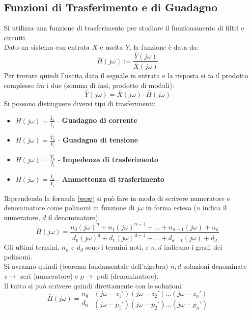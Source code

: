 \documentclass[../main.tex]{subfiles}
\begin{document}
	\subsection{Funzioni di Trasferimento e di Guadagno}
	Si utilizza una funzione di trasferimento per studiare il funzionamento di filtri e circuiti. \\
	Dato un sistema con entrata $\bar X$ e uscita $\bar Y$, la funzione è data da:
	\begin{equation} \label{wow}
		\bar H(j\omega) := \frac{\bar Y(j\omega)}{\bar X(j\omega)}	
	\end{equation}
	Per trovare quindi l'uscita dato il segnale in entrata e la risposta si fa il prodotto complesso fra i due (somma di fasi, prodotto di moduli):
	\begin{equation}
		\bar Y(j\omega) = \bar X(j\omega) \cdot \bar H(j\omega)	
	\end{equation}
	Si possono distinguere diversi tipi di trasferimenti:
	\begin{itemize}
		\item $H(j\omega) = \frac{\bar I_u}{\bar I_i}$ - \textbf{Guadagno di corrente}
		\item $H(j\omega) = \frac{\bar V_u}{\bar V_i}$ - \textbf{Guadagno di tensione}
		\item $H(j\omega) = \frac{\bar V_u}{\bar I_i}$ - \textbf{Impedenza di trasferimento}
		\item $H(j\omega) = \frac{\bar I_u}{\bar V_i}$ - \textbf{Ammettenza di trasferimento}
	\end{itemize}
	Riprendendo la formula \ref{wow} si può fare in modo di scrivere numeratore e denominatore come polinomi in funzione di $j\omega$ in forma estesa ($n$ indica il numeratore, $d$ il denominatore):
	\begin{equation}
		\bar H(j\omega) = \frac{n_0 (j\omega)^n + n_1(j\omega)^{n-1} + \dots + n_{n-1}(j\omega) + n_n}{d_0(j\omega)^d+d_1(j\omega)^{d-1}+\dots+d_{d-1}(j\omega) +d_d}
	\end{equation}
	Gli ultimi termini, $n_n$ e $d_d$ sono i termini noti, e $n, d$ indicano i gradi dei polinomi. \\
	Si avranno quindi (teorema fondamentale dell'algebra) $n, d$ soluzioni denominate $z\rightarrow$ zeri (numeratore) e $p\rightarrow$ poli (denominatore). \\
	Il tutto si può scrivere quindi direttamente con le soluzioni:
	\begin{equation}
		\bar H(j\omega) = \frac{n_0}{d_0} \cdot \frac{(j\omega - z_1 ')(j\omega - z_2') \dots (j\omega - z_n')}{(j\omega - p_1')(j\omega - p_2')\dots(j\omega - p_n')}	
	\end{equation}
\end{document}
